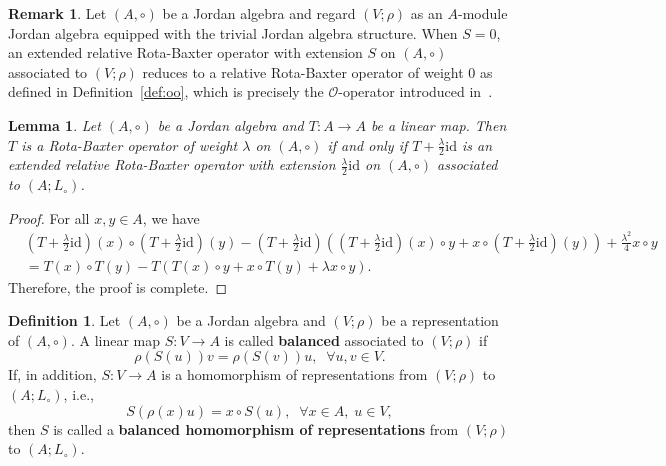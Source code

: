 \documentclass[12pt, reqno, a4paper]{amsart}
\newtheorem{lemma}[theorem]{Lemma}
\theoremstyle{definition}
\newtheorem{definition}[theorem]{Definition}
\newtheorem{remark}[theorem]{Remark}
\newcommand{\id}{\mathrm{id}}
\begin{document}
\begin{remark}
	Let $(A, \circ)$ be a Jordan algebra and regard $(V; \rho)$ as an $A$-module Jordan algebra equipped with the trivial Jordan algebra structure. 
	When $S = 0$, an extended relative Rota-Baxter operator with extension $S$ on $(A, \circ)$ associated to $(V; \rho)$ reduces to a relative Rota-Baxter operator of weight $0$ as defined in Definition~\ref{def:oo}, which is precisely the $\mathcal{O}$-operator introduced in~\cite[Definition~3.5]{hou2013pre}.
\end{remark}



\begin{lemma}\label{lem:rb2eo}
	Let $(A, \circ)$ be a Jordan algebra and $T: A \to A$ be a linear map.
	Then $T$ is a Rota-Baxter operator of weight $\lambda$ on $(A, \circ)$ if and only if $T + \frac{\lambda}{2}\id$ is an extended relative Rota-Baxter operator with extension $\frac{\lambda}{2}\id$ on $(A, \circ)$ associated to $(A; L_{\circ})$.
\end{lemma}
\begin{proof}
	For all $x, y \in A$, we have
	\begin{align*}
		 & (T + \frac{\lambda}{2}\id)(x) \circ (T + \frac{\lambda}{2}\id)(y) - (T + \frac{\lambda}{2}\id)\left( (T + \frac{\lambda}{2}\id)(x) \circ y + x \circ (T + \frac{\lambda}{2}\id)(y)\right) + \frac{\lambda^2}{4} x \circ y \\
		 & = T(x) \circ T(y) - T(T(x) \circ y + x \circ T(y) + \lambda x \circ y).
	\end{align*}
	Therefore, the proof is complete.
\end{proof}



\begin{definition}
	Let $(A, \circ)$ be a Jordan algebra and $(V; \rho)$ be a representation of $(A, \circ)$.
	A linear map $S: V \to A$ is called \textbf{balanced} associated to $(V; \rho)$ if
	\begin{equation}
		\rho(S(u))v = \rho(S(v))u, \;\; \forall u, v \in V. \label{eq:bal}
	\end{equation}
	If, in addition, $S: V \to A$ is a homomorphism of representations from $(V; \rho)$ to $(A; L_{\circ})$, i.e.,
	\begin{equation}
		S(\rho(x)u) = x \circ S(u), \;\; \forall x \in A, \; u \in V, \label{eq:ainv}
	\end{equation}
	then $S$ is called a \textbf{balanced homomorphism of representations} from $(V; \rho)$ to $(A; L_{\circ})$.
\end{definition}
\end{document}
